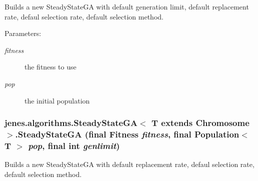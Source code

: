Builds a new SteadyStateGA with default generation limit, default replacement rate, defaul selection rate, default selection method.

\begin{Desc}
\item[Parameters:]
\begin{description}
\item[{\em fitness}]the fitness to use \item[{\em pop}]the initial population \end{description}
\end{Desc}
\hypertarget{classjenes_1_1algorithms_1_1_steady_state_g_a_3_01_t_01extends_01_chromosome_01_4_6dba077ffc454a1863b7d15cecac32b4}{
\subsubsection[SteadyStateGA]{\setlength{\rightskip}{0pt plus 5cm}jenes.algorithms.SteadyStateGA$<$ T extends Chromosome $>$.SteadyStateGA (final Fitness {\em fitness}, \/  final Population$<$ T $>$ {\em pop}, \/  final int {\em genlimit})}}
\label{classjenes_1_1algorithms_1_1_steady_state_g_a_3_01_t_01extends_01_chromosome_01_4_6dba077ffc454a1863b7d15cecac32b4}


Builds a new SteadyStateGA with default replacement rate, defaul selection rate, default selection method.

